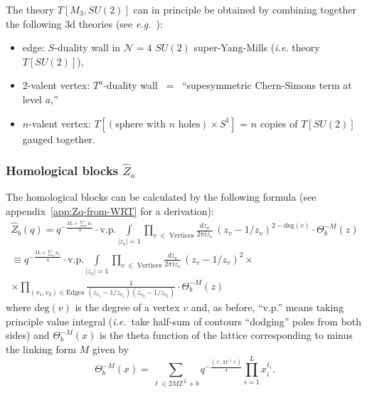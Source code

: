 \documentclass[hyper,letterpaper]{JHEP3}
\newcommand{\Z}{{\mathbb Z}}
\renewcommand{\hat}{\widehat}
\def\CN{{\mathcal N}}
\def\eg{{\textit{e.g.}}}
\def\ie{{\textit{i.e.}}}
\begin{document}
The theory $T[M_3,SU(2)]$ can in principle be obtained by combining together the following 3d theories (see \eg~\cite{Gadde:2013sca}):
\begin{itemize}
	\item edge: $S$-duality wall in $\CN=4$ $SU(2)$ super-Yang-Mills ({\it i.e.} theory $T[SU(2)]$),
	\item 2-valent vertex: $T^a$-duality wall $~=~$ ``supesymmetric Chern-Simons term at level $a$,''
	\item $n$-valent vertex: $T[(\text{sphere with $n$ holes})\times S^1]$ =  $n$ copies of $T[SU(2)]$ gauged together.
\end{itemize}


\subsubsection{Homological blocks ${\hat{Z}_a}$}
\label{sec:plumbing-blocks}

The homological blocks can be calculated by the following formula (see appendix~\ref{app:Zq-from-WRT} for a derivation):
\begin{multline}
	\hat{Z}_b(q)=q^{-\frac{3L+\sum_v a_{v}}{4}}\cdot\text{v.p.}\int\limits_{|z_v|=1}
\prod_{v\;\in\; \text{Vertices}}
\frac{dz_v}{2\pi iz_v}\,
\left({z_v-1/z_v}\right)^{2-\text{deg}(v)}\cdot\Theta^{-M}_b(z)
	\\
	\equiv q^{-\frac{3L+\sum_v a_{v}}{4}}\cdot\text{v.p.}\int\limits_{|z_v|=1}
\prod_{v\;\in\; \text{Vertices}}
\frac{dz_v}{2\pi iz_v}\,
\left({z_v-1/z_v}\right)^{2}\times\\
\times\prod_{(v_1,v_2)\in \text{Edges}}\frac{1}{(z_{v_1}-1/z_{v_1})(z_{v_2}-1/z_{v_2})}
\cdot\Theta^{-M}_b(z)
	\label{Z-hat-def-0}
\end{multline}
where $\text{deg}(v)$ is the degree of a vertex $v$ and, as before, ``v.p.'' means taking principle value integral (\ie~take half-sum of contours ``dodging'' poles from both sides) and $\Theta^{-M}_b(x)$ is the theta function of the lattice corresponding to minus the linking form $M$ given by
\begin{equation}
	\Theta^{-M}_b(x)=\sum_{\ell \in 2M\Z^L+b}q^{-\frac{(\ell,M^{-1}\ell)}{4}}
	\prod_{i=1}^Lx_i^{\ell_i}.
\end{equation}
\end{document}
